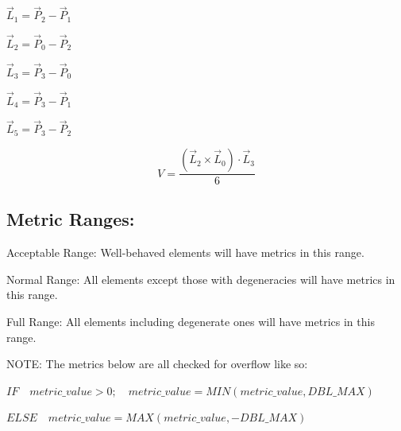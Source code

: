 \documentclass[12pt]{article}
\def\beq{\begin{equation}}
\def\eeq{\end{equation}}
\begin{document}
\begin{center}
$\vec L_1 = \vec P_2 - \vec P_1 $
\end{center}

\begin{center}
$\vec L_2 = \vec P_0 - \vec P_2 $
\end{center}

\begin{center}
$\vec L_3 = \vec P_3 - \vec P_0 $
\end{center}

\begin{center}
$\vec L_4 = \vec P_3 - \vec P_1 $
\end{center}

\begin{center}
$\vec L_5 = \vec P_3 - \vec P_2 $
\end{center}


\beq 
V = \frac { \left( \vec L_2 \times \vec L_0 \right) \cdot \vec L_3  }  
          {6} 
\eeq

\subsection*{Metric Ranges:}

\begin{flushleft}
Acceptable Range: Well-behaved elements will have metrics in this range.
\end{flushleft}
\begin{flushleft}
Normal Range:     All elements except those with degeneracies will have  \newline
                  metrics in this range.
\end{flushleft}
\begin{flushleft}
Full Range:       All elements including degenerate ones will have metrics \newline
                  in this range. 
\end{flushleft}

\begin{flushleft}
NOTE:  The metrics below are all checked for overflow like so:
\end{flushleft}

\begin{flushleft}
${IF \quad metric\_value > 0;  \quad metric\_value = MIN( metric\_value, DBL\_MAX )}$
\end{flushleft}
 
\begin{flushleft}
${ELSE \quad metric\_value = MAX( metric\_value, -DBL\_MAX )}$
\end{flushleft}
\end{document}
